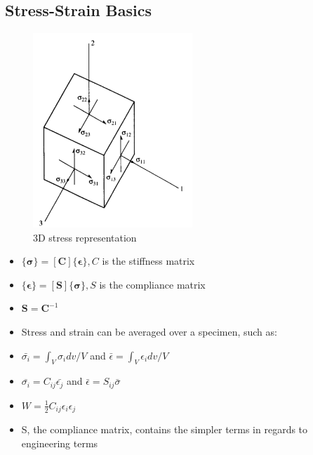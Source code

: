 \documentclass[11pt]{article}
\begin{document}
    \subsection{Stress-Strain Basics}

    \begin{figure}[H]
        \includegraphics[width=6cm]{3D_stress_state}\centering
        \caption{3D stress representation}
        \label{fig:2}
    \end{figure}

    \begin{itemize}
        \item{$\{ \pmb{\sigma} \} = [\mathbf{C}] \{ \pmb{\epsilon} \}, C$ is the stiffness matrix}
        \item{$\{ \pmb{\epsilon} \} = [\mathbf{S}] \{ \pmb{\sigma} \}, S$ is the compliance matrix}
        \item{$\mathbf{S} = \mathbf{C}^{-1}$}
        \item{Stress and strain can be averaged over a specimen, such as:}
        \item{$ \bar{\sigma_i} = \int_V{\sigma_i}dv/V$ and $ \bar{\epsilon} = \int_V{\epsilon_i}dv/V$}
        \item{$ \bar{\sigma_i} = C_{ij} \bar{\epsilon_j}$ and $ \bar{\epsilon} = S_{ij} \bar{\sigma}$}
        \item{$ W = \frac{1}{2} C_{ij} \epsilon_i \epsilon_j$}
        \item{S, the compliance matrix, contains the simpler terms in regards to engineering terms}
    \end{itemize}
\end{document}
